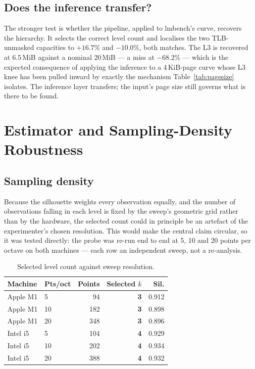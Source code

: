\documentclass[conference]{IEEEtran}
\begin{document}
\subsection{Does the inference transfer?}

The stronger test is whether the pipeline, applied to lmbench's curve, recovers
the hierarchy. It selects the correct level count and localises the two
TLB-unmasked capacities to $+16.7\%$ and $-10.0\%$, both matches. The L3 is
recovered at 6.5\,MiB against a nominal 20\,MiB --- a miss at $-68.2\%$ --- which
is the expected consequence of applying the inference to a 4\,KiB-page curve
whose L3 knee has been pulled inward by exactly the mechanism
Table~\ref{tab:pagesize} isolates. The inference layer transfers; the input's page
size still governs what is there to be found.

\section{Estimator and Sampling-Density Robustness}
\label{app:robustness}

\subsection{Sampling density}

Because the silhouette weights every observation equally, and the number of
observations falling in each level is fixed by the sweep's geometric grid rather
than by the hardware, the selected count could in principle be an artefact of the
experimenter's chosen resolution. This would make the central claim circular, so
it was tested directly: the probe was re-run end to end at 5, 10 and 20 points
per octave on both machines --- each row an independent sweep, not a re-analysis.

\begin{table}[h]
\caption{Selected level count against sweep resolution.}
\label{tab:density}
\centering
\footnotesize
\begin{tabular}{@{}llrrr@{}}
\toprule
\textbf{Machine} & \textbf{Pts/oct} & \textbf{Points} & \textbf{Selected $k$} & \textbf{Sil.} \\
\midrule
Apple M1 & 5  & 94  & \textbf{3} & 0.912 \\
Apple M1 & 10 & 182 & \textbf{3} & 0.898 \\
Apple M1 & 20 & 348 & \textbf{3} & 0.896 \\
Intel i5 & 5  & 104 & \textbf{4} & 0.929 \\
Intel i5 & 10 & 202 & \textbf{4} & 0.934 \\
Intel i5 & 20 & 388 & \textbf{4} & 0.932 \\
\bottomrule
\end{tabular}
\end{table}
\end{document}

